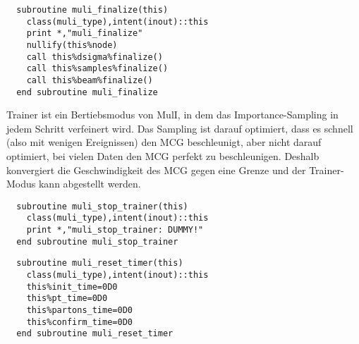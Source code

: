 \begin{Verbatim}
  subroutine muli_finalize(this)
    class(muli_type),intent(inout)::this
    print *,"muli_finalize"
    nullify(this%node)
    call this%dsigma%finalize()
    call this%samples%finalize()
    call this%beam%finalize()
  end subroutine muli_finalize
\end{Verbatim}

Trainer ist ein Bertiebsmodus von MulI, in dem das Importance-Sampling in jedem Schritt verfeinert wird. Das Sampling ist darauf optimiert, dass es schnell (also mit wenigen Ereignissen) den MCG beschleunigt, aber nicht darauf optimiert, bei vielen Daten den MCG perfekt zu beschleunigen. Deshalb konvergiert die Geschwindigkeit des MCG gegen eine Grenze und der Trainer-Modus kann abgestellt werden.


\begin{Verbatim}
  subroutine muli_stop_trainer(this)
    class(muli_type),intent(inout)::this
    print *,"muli_stop_trainer: DUMMY!"
  end subroutine muli_stop_trainer
\end{Verbatim}

\begin{Verbatim}
  subroutine muli_reset_timer(this)
    class(muli_type),intent(inout)::this
    this%init_time=0D0
    this%pt_time=0D0
    this%partons_time=0D0
    this%confirm_time=0D0
  end subroutine muli_reset_timer
\end{Verbatim}

